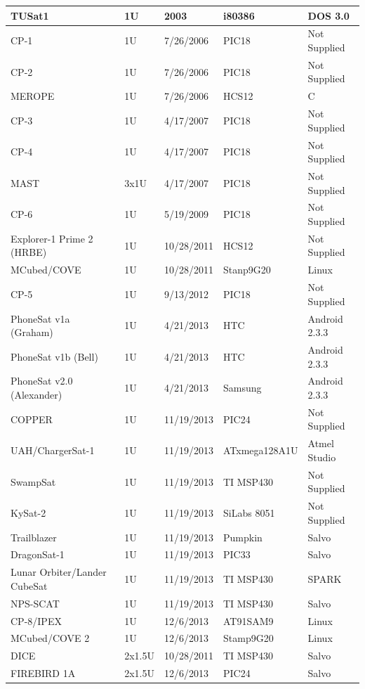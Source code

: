 \documentclass[11pt]{article}
\begin{document}
\begin{center}
\begin{longtable}{|l|l|l|l|l|}
\hline \hline
\endlastfoot
TUSat1 & 1U & 2003 & i80386 & DOS 3.0 \\ \hline
CP-1 & 1U & 7/26/2006 & PIC18 & Not Supplied \\ \hline
CP-2 & 1U & 7/26/2006 & PIC18 & Not Supplied \\ \hline
MEROPE & 1U & 7/26/2006 & HCS12 & C \\ \hline
CP-3 & 1U & 4/17/2007 & PIC18 & Not Supplied \\ \hline
CP-4 & 1U & 4/17/2007 & PIC18 & Not Supplied \\ \hline
MAST & 3x1U & 4/17/2007 & PIC18 & Not Supplied \\ \hline
CP-6 & 1U & 5/19/2009 & PIC18 & Not Supplied \\ \hline
Explorer-1 Prime 2 (HRBE) & 1U & 10/28/2011 & HCS12 & Not Supplied \\ \hline
MCubed/COVE & 1U & 10/28/2011 & Stanp9G20 & Linux \\ \hline
CP-5 & 1U & 9/13/2012 & PIC18 & Not Supplied \\ \hline
PhoneSat v1a (Graham) & 1U & 4/21/2013 & HTC & Android 2.3.3 \\ \hline
PhoneSat v1b (Bell) & 1U & 4/21/2013 & HTC & Android 2.3.3 \\ \hline
PhoneSat v2.0 (Alexander) & 1U & 4/21/2013 & Samsung & Android 2.3.3 \\ \hline
COPPER & 1U & 11/19/2013 & PIC24 & Not Supplied \\ \hline
UAH/ChargerSat-1 & 1U & 11/19/2013 & ATxmega128A1U & Atmel Studio \\ \hline
SwampSat & 1U & 11/19/2013 & TI MSP430 & Not Supplied \\ \hline
KySat-2 & 1U & 11/19/2013 & SiLabs 8051 & Not Supplied \\ \hline
Trailblazer & 1U & 11/19/2013 & Pumpkin & Salvo \\ \hline
DragonSat-1 & 1U & 11/19/2013 & PIC33 & Salvo \\ \hline
Lunar Orbiter/Lander CubeSat & 1U & 11/19/2013 & TI MSP430 & SPARK \\ \hline
NPS-SCAT & 1U & 11/19/2013 & TI MSP430 & Salvo \\ \hline
CP-8/IPEX & 1U & 12/6/2013 & AT91SAM9 & Linux \\ \hline
MCubed/COVE 2 & 1U & 12/6/2013 & Stamp9G20 & Linux \\ \hline
DICE & 2x1.5U & 10/28/2011 & TI MSP430 & Salvo \\ \hline
FIREBIRD 1A & 2x1.5U & 12/6/2013 & PIC24 & Salvo \\ \hline

\end{longtable}
\end{center}
\end{document}
